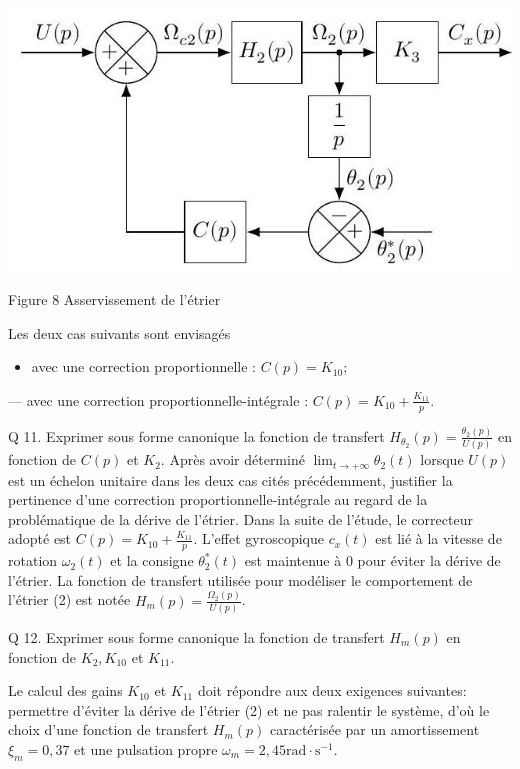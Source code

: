 \documentclass[10pt]{article}
\begin{document}
\begin{center}
\includegraphics[max width=\textwidth]{2023_07_26_54f5e859400a10e656ddg-05}
\end{center}

Figure 8 Asservissement de l'étrier

Les deux cas suivants sont envisagés

\begin{itemize}
  \item avec une correction proportionnelle : $C(p)=K_{10}$;
\end{itemize}

— avec une correction proportionnelle-intégrale : $C(p)=K_{10}+\frac{K_{11}}{p}$.

Q 11. Exprimer sous forme canonique la fonction de transfert $H_{\theta_{2}}(p)=\frac{\theta_{2}(p)}{U(p)}$ en fonction de $C(p)$ et $K_{2}$. Après avoir déterminé $\lim _{t \rightarrow+\infty} \theta_{2}(t)$ lorsque $U(p)$ est un échelon unitaire dans les deux cas cités précédemment, justifier la pertinence d'une correction proportionnelle-intégrale au regard de la problématique de la dérive de l'étrier. Dans la suite de l'étude, le correcteur adopté est $C(p)=K_{10}+\frac{K_{11}}{p}$. L'effet gyroscopique $c_{x}(t)$ est lié à la vitesse de rotation $\omega_{2}(t)$ et la consigne $\theta_{2}^{*}(t)$ est maintenue à 0 pour éviter la dérive de l'étrier. La fonction de transfert utilisée pour modéliser le comportement de l'étrier (2) est notée $H_{m}(p)=\frac{\Omega_{2}(p)}{U(p)}$.

Q 12. Exprimer sous forme canonique la fonction de transfert $H_{m}(p)$ en fonction de $K_{2}, K_{10}$ et $K_{11}$.

Le calcul des gains $K_{10}$ et $K_{11}$ doit répondre aux deux exigences suivantes: permettre d'éviter la dérive de l'étrier (2) et ne pas ralentir le système, d'où le choix d'une fonction de transfert $H_{m}(p)$ caractérisée par un amortissement $\xi_{m}=0,37$ et une pulsation propre $\omega_{m}=2,45 \mathrm{rad} \cdot \mathrm{s}^{-1}$.
\end{document}
